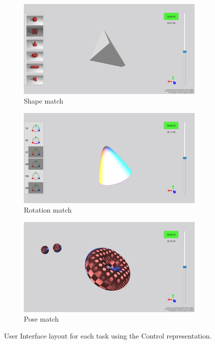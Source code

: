 \documentclass{l4proj}
\begin{document}
\begin{figure}
  \begin{subfigure}[b]{0.33\textwidth}
    \includegraphics[width=\textwidth]{images/tasks/shape_match.PNG}
    \caption{
      Shape match
    }
    \label{fig:task_s}
  \end{subfigure}
  \begin{subfigure}[b]{0.33\textwidth}
    \includegraphics[width=\textwidth]{images/tasks/rotation_match.PNG}
    \caption{
      Rotation match
    }
    \label{fig:task_r}
  \end{subfigure}
  \begin{subfigure}[b]{0.33\textwidth}
    \includegraphics[width=\textwidth]{images/tasks/pose_match.PNG}
    \caption{
      Pose match
    }
    \label{fig:task_p}
  \end{subfigure}
  \caption{User Interface layout for each task using the Control representation.}
  \label{fig:tasks}
\end{figure}
\end{document}

